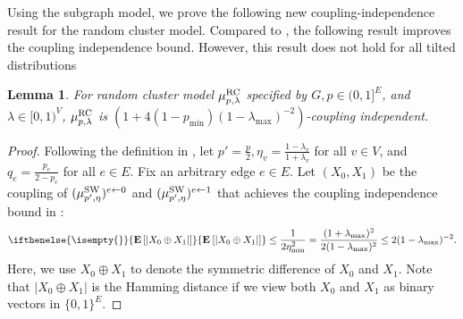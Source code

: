 \documentclass[11pt,a4paper]{article}
\newtheorem{lemma}[theorem]{Lemma}
\theoremstyle{definition}
\newcommand{\E}[2][]{ \ifthenelse{\isempty{#1}}
  {\mathbf{\mathbf{E}}\left[#2\right]}
  {\mathbf{\mathbf{E}}_{#1}\left[#2\right]} }
\begin{document}
Using the subgraph model, we prove the following new coupling-independence result for the random cluster model. Compared to , the following result improves the coupling independence bound. However, this result does not hold for all tilted distributions
\begin{lemma}\label{lem:CI-rc-large-lambda}
    For random cluster model $\mu_{p,\lambda}^{\textnormal{RC}}$ specified by $G,p\in (0,1]^E$, and $\lambda\in [0,1)^V$, $\mu_{p,\lambda}^{\textnormal{RC}}$ is $(1 +4(1-p_{\min})(1-\lambda_{\max})^{-2})$-coupling independent.    
\end{lemma}
\begin{proof}
    Following the definition in ,
    let $p'=\frac{p}{2}, \eta_v = \frac{1-\lambda_v}{1+\lambda_v}$ for all $v \in V$, and $q_e=\frac{p_e}{2-p_e}$ for all $e \in E$.
    Fix an arbitrary edge $e \in E$.
    Let $(X_0,X_1)$ be the coupling of $(\mu_{p',\eta}^{\textnormal{SW}})^{e\gets 0}$ and $(\mu_{p',\eta}^{\textnormal{SW}})^{e\gets 1}$ that achieves the coupling independence bound in :
    \begin{align}\label{eq:sw-CI-bound}
        \E[]{|X_0 \oplus X_1|}\leq \frac{1}{2\eta_{\min}^2}=\frac{(1+\lambda_{\max})^2}{2(1-\lambda_{\max})^2}\leq 2(1-\lambda_{\max})^{-2}.
    \end{align}
    Here, we use $X_0 \oplus X_1$ to denote the symmetric difference of $X_0$ and $X_1$. Note that $|X_0 \oplus X_1|$ is the Hamming distance if we view both $X_0$ and $X_1$ as binary vectors in $\{0,1\}^E$.


\end{proof}
\end{document}
